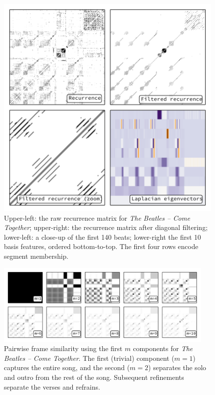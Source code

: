 \documentclass{article}
\begin{document}
\begin{figure}
\centering
\includegraphics[width=0.95\columnwidth]{figs/recurrence}
\caption{Upper-left: the raw recurrence matrix for \emph{The Beatles -- Come Together}; upper-right: the
recurrence matrix after diagonal filtering; lower-left: a close-up of the first 140 beats; lower-right the first
10 basis features, ordered bottom-to-top.  The first four rows encode segment membership.\label{recurrence}}
\end{figure}

 
\begin{figure}
\centering
\includegraphics[width=0.95\textwidth]{figs/lowrank}
\caption{Pairwise frame similarity using the first $m$ components for \emph{The Beatles -- Come Together}.  The first
(trivial) component ($m=1$) captures the entire song, and the second ($m=2$) separates the solo and outro from the
rest of the song.  Subsequent refinements separate the verses and refrains.\label{lowrank}}
\end{figure}
\end{document}
